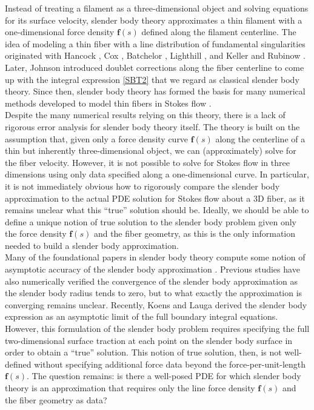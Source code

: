 \documentclass[11pt]{article}
\numberwithin{equation}{section}
\theoremstyle{definition}
\begin{document}
Instead of treating a filament as a three-dimensional object and solving equations for its surface velocity, slender body theory approximates a thin filament with a one-dimensional force density $\bm{f}(s)$ defined along the filament centerline. The idea of modeling a thin fiber with a line distribution of fundamental singularities originated with Hancock \cite{hancock1953self}, Cox \cite{cox1970motion}, Batchelor \cite{batchelor1970slender}, Lighthill \cite{lighthill1975mathematical}, and Keller and Rubinow \cite{keller1976slender}. Later, Johnson \cite{johnson1980improved} introduced doublet corrections along the fiber centerline to come up with the integral expression \eqref{SBT2} that we regard as classical slender body theory. Since then, slender body theory has formed the basis for many numerical methods developed to model thin fibers in Stokes flow \cite{bouzarth2011modeling, bringley2008validation, cortez2005method, cortez2012slender, gotz2000interactions, shelley2000stokesian, tornberg2006numerical, tornberg2004simulating}. \\

Despite the many numerical results relying on this theory, there is a lack of rigorous error analysis for slender body theory itself. The theory is built on the assumption that, given only a force density curve $\bm{f}(s)$ along the centerline of a thin but inherently three-dimensional object, we can (approximately) solve for the fiber velocity. However, it is not possible to solve for Stokes flow in three dimensions using only data specified along a one-dimensional curve. In particular, it is not immediately obvious how to rigorously compare the slender body approximation to the actual PDE solution for Stokes flow about a 3D fiber, as it remains unclear what this ``true'' solution should be. Ideally, we should be able to define a unique notion of true solution to the slender body problem given only the force density $\bm{f}(s)$ and the fiber geometry, as this is the only information needed to build a slender body approximation.  \\

Many of the foundational papers in slender body theory compute some notion of asymptotic accuracy of the slender body approximation \cite{gotz2000interactions, johnson1980improved, keller1976slender, sellier1999stokes}. Previous studies \cite{bouzarth2011modeling} have also numerically verified the convergence of the slender body approximation as the slender body radius tends to zero, but to what exactly the approximation is converging remains unclear. Recently, Koens and Lauga \cite{koens2018boundary} derived the slender body expression as an asymptotic limit of the full boundary integral equations. However, this formulation of the slender body problem requires specifying the full two-dimensional surface traction at each point on the slender body surface in order to obtain a ``true'' solution. This notion of true solution, then, is not well-defined without specifying additional force data beyond the force-per-unit-length $\bm{f}(s)$. The question remains: is there a well-posed PDE for which slender body theory is an approximation that requires only the line force density $\bm{f}(s)$ and the fiber geometry as data? \\
\end{document}
